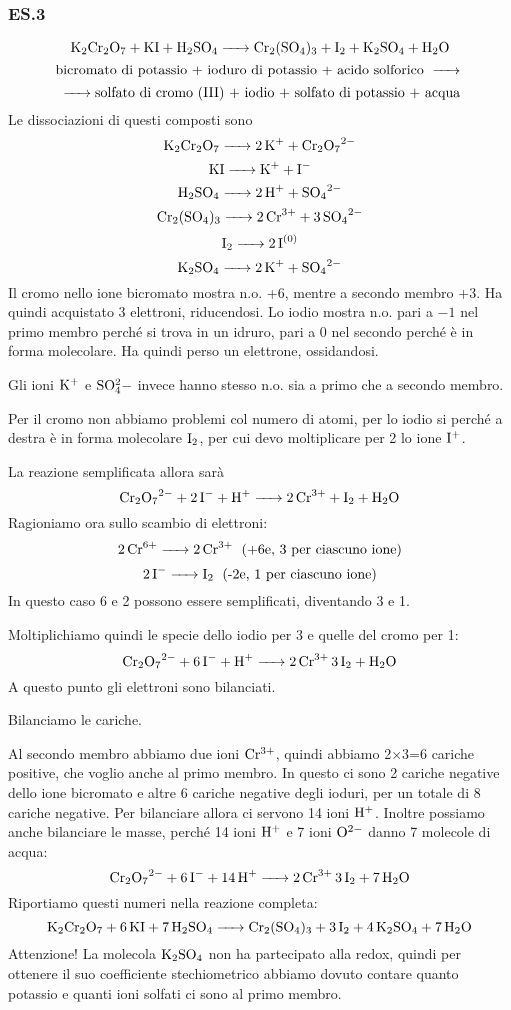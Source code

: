 \vspace{0.2cm}\subsubsection{\textbf{ES.3}}
$$\ce{K_2Cr_2O_7 + KI + H_2SO_4 -> Cr_2(SO_4)_3 + I_2 + K_2SO_4 + H_2O}$$
$$\text{bicromato di potassio + ioduro di potassio + acido solforico \ce{->}}$$
$${\ce{->} \text{solfato di cromo (III) +  iodio + solfato di potassio + acqua}}$$
Le dissociazioni di questi composti sono
$$\ce{K_2Cr_2O_7 -> 2K^+ + Cr_2O_7^2-}$$ 
$$\ce{KI -> K+ + I-}$$
$$\ce{H_2SO_4 -> 2H+ + SO_4^2-}$$
$$\ce{Cr_2(SO_4)_3 -> 2Cr^3+ + 3SO_4^2-}$$
$$\ce{I_2 -> 2I^{(0)}}$$
$$\ce{K_2SO_4 -> 2K+ + SO_4^2-}$$
Il cromo nello ione bicromato mostra n.o. +6, mentre a secondo membro +3. Ha quindi acquistato 3 elettroni, riducendosi.
Lo iodio mostra n.o. pari a $-1$ nel primo membro perché si trova in un idruro, pari a 0 nel secondo perché è in forma molecolare. Ha quindi perso un elettrone, ossidandosi.

Gli ioni $\rm K^+$ e $\rm SO_4^2-$ invece hanno stesso n.o. sia a primo che a secondo membro.

Per il cromo non abbiamo problemi col numero di atomi, per lo iodio si perché a destra è in forma molecolare $\rm I_2$, per cui devo moltiplicare per 2 lo ione $\rm I^+$.

La reazione semplificata allora sarà
$$\ce{Cr_2O_7^2- + 2I^- + H+ -> 2Cr^3+ + I_2 + H_2O}$$
Ragioniamo ora sullo scambio di elettroni:
$$\ce{2Cr^6+ -> 2Cr^3+ \; \text{(+6e, 3 per ciascuno ione)}}$$
$$\ce{2I- -> I_2 \; \text{(-2e, 1 per ciascuno ione)}}$$
In questo caso 6 e 2 possono essere semplificati, diventando 3 e 1.

Moltiplichiamo quindi le specie dello iodio per 3 e quelle del cromo per 1:
$$\ce{Cr_2O_7^2- + 6I^- + H+ -> 2Cr^3+ 3I_2 + H_2O}$$
A questo punto gli elettroni sono bilanciati.

Bilanciamo le cariche.

Al secondo membro abbiamo due ioni $\rm Cr^{3+}$, quindi abbiamo 2$\times$3=6 cariche positive, che voglio anche al primo membro. In questo ci sono 2 cariche negative dello ione bicromato e altre 6 cariche negative degli ioduri, per un totale di 8 cariche negative. Per bilanciare allora ci servono 14 ioni $\rm H^+$. Inoltre possiamo anche bilanciare le masse, perché 14 ioni $\rm H^+$ e 7 ioni $\rm O^{2-}$ danno 7 molecole di acqua:
$$\ce{Cr_2O_7^2- + 6I^- + 14H+ -> 2Cr^3+ 3I_2 + 7H_2O}$$
Riportiamo questi numeri nella reazione completa:
$$\ce{K_2Cr_2O_7 + 6KI + 7H_2SO_4 -> Cr_2(SO_4)_3 + 3I_2 + 4K_2SO_4 + 7H_2O}$$
Attenzione! La molecola $\rm K_2SO_4$ non ha partecipato alla redox, quindi per ottenere il suo coefficiente stechiometrico abbiamo dovuto contare quanto potassio e quanti ioni solfati ci sono al primo membro.

